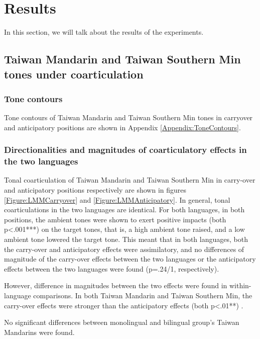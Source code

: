 
\chapter{Results}\label{chapter:Results}

In this section, we will talk about the results of the experiments.

\section{Taiwan Mandarin and Taiwan Southern Min tones under coarticulation}

\subsection{Tone contours}

Tone contours of Taiwan Mandarin and Taiwan Southern Min tones in carryover and anticipatory positions are shown in Appendix \ref{Appendix:ToneContours}.

\subsection{Directionalities and magnitudes of coarticulatory effects in the two languages}

Tonal coarticulation of Taiwan Mandarin and Taiwan Southern Min in carry-over and anticipatory positions respectively are shown in figures \ref{Figure:LMMCarryover} and \ref{Figure:LMMAnticipatory}. In general, tonal coarticulations in the two languages are identical. For both languages, in both positions, the ambient tones were shown to exert positive impacts (both p<.001***) on the target tones, that is, a high ambient tone raised, and a low ambient tone lowered the target tone. This meant that in both languages, both the carry-over and anticipatory effects were assimilatory, and no differences of magnitude of the carry-over effects between the two languages or the anticipatory effects between the two languages were found (p=.24/1, respectively).

However, difference in magnitudes between the two effects were found in within-language comparisons. In both Taiwan Mandarin and Taiwan Southern Min, the carry-over effects were stronger than the anticipatory effects (both p<.01**) .

No significant differences between monolingual and bilingual group's Taiwan Mandarins were found.

